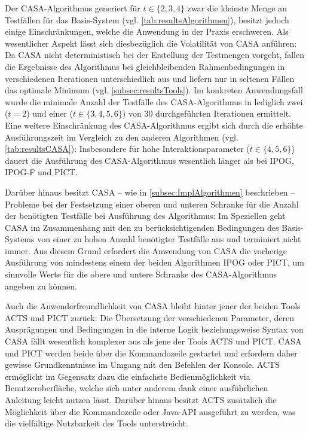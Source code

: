 \begin{enumerate}
Der CASA-Algorithmus generiert für $t \in \{2,3,4\}$ zwar die kleinste Menge an Testfällen für das Basis-System (vgl. \autoref{tab:resultsAlgorithmen}), besitzt jedoch einige Einschränkungen, welche die Anwendung in der Praxis erschweren. Als wesentlicher Aspekt lässt sich diesbezüglich die Volatilität von CASA anführen: Da CASA nicht deterministisch bei der Erstellung der Testmengen vorgeht, fallen die Ergebnisse des Algorithmus bei gleichbleibenden Rahmenbedingungen in verschiedenen Iterationen unterschiedlich aus und liefern nur in seltenen Fällen das optimale Minimum (vgl. \autoref{subsec:resultsTools}). Im konkreten Anwendungsfall wurde die minimale Anzahl der Testfälle des CASA-Algorithmus in lediglich zwei ($t=2$) und einer ($t \in \{3,4,5,6\}$) von 30 durchgeführten Iterationen ermittelt. Eine weitere Einschränkung des CASA-Algorithmus ergibt sich durch die erhöhte Ausführungszeit im Vergleich zu den anderen Algorithmen (vgl. \autoref{tab:resultsCASA}): Insbesondere für hohe Interaktionsparameter ($t \in \{4,5,6\}$) dauert die Ausführung des CASA-Algorithmus wesentlich länger als bei IPOG, IPOG-F und PICT.

Darüber hinaus besitzt CASA -- wie in \autoref{subsec:ImplAlgorithmen} beschrieben -- Probleme bei der Festsetzung einer oberen und unteren Schranke für die Anzahl der benötigten Testfälle bei Ausführung des Algorithmus: Im Speziellen geht CASA im Zusammenhang mit den zu berücksichtigenden Bedingungen des Basis-Systems von einer zu hohen Anzahl benötigter Testfälle aus und terminiert nicht immer. Aus diesem Grund erfordert die Anwendung von CASA die vorherige Ausführung von mindestens einem der beiden Algorithmen IPOG oder PICT, um sinnvolle Werte für die obere und untere Schranke des CASA-Algorithmus angeben zu können.

Auch die Anwenderfreundlichkeit von CASA bleibt hinter jener der beiden Tools ACTS und PICT zurück: Die Übersetzung der verschiedenen Parameter, deren Ausprägungen und Bedingungen in die interne Logik beziehungsweise Syntax von CASA fällt wesentlich komplexer aus als jene der Tools ACTS und PICT. CASA und PICT werden beide über die Kommandozeile gestartet und erfordern daher gewisse Grundkenntnisse im Umgang mit den Befehlen der Konsole. ACTS ermöglicht im Gegensatz dazu die einfachste Bedienmöglichkeit via Benutzeroberfläche, welche sich unter anderem dank einer ausführlichen Anleitung leicht nutzen lässt. Darüber hinaus besitzt ACTS zusätzlich die Möglichkeit über die Kommandozeile oder Java-API ausgeführt zu werden, was die vielfältige Nutzbarkeit des Tools unterstreicht.

\end{enumerate}

